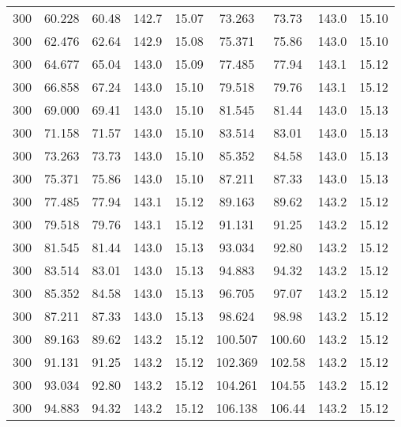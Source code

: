 \documentclass[captions=tableheading]{scrartcl}
\begin{document}
\begin{table}
\begin{tabular}{S[table-format=3.0] S[table-format=2.3] S[table-format=2.2] S[table-format=3.1] S[table-format=2.2] S[table-format=3.3] S[table-format=3.2] S[table-format=3.1] S[table-format=2.2]}
    300 &  60.228 &  60.48 & 142.7 & 15.07 &   73.263 &  73.73 & 143.0 & 15.10 \\
    300 &  62.476 &  62.64 & 142.9 & 15.08 &   75.371 &  75.86 & 143.0 & 15.10 \\
    300 &  64.677 &  65.04 & 143.0 & 15.09 &   77.485 &  77.94 & 143.1 & 15.12 \\
    300 &  66.858 &  67.24 & 143.0 & 15.10 &   79.518 &  79.76 & 143.1 & 15.12 \\
    300 &  69.000 &  69.41 & 143.0 & 15.10 &   81.545 &  81.44 & 143.0 & 15.13 \\
    300 &  71.158 &  71.57 & 143.0 & 15.10 &   83.514 &  83.01 & 143.0 & 15.13 \\
    300 &  73.263 &  73.73 & 143.0 & 15.10 &   85.352 &  84.58 & 143.0 & 15.13 \\
    300 &  75.371 &  75.86 & 143.0 & 15.10 &   87.211 &  87.33 & 143.0 & 15.13 \\
    300 &  77.485 &  77.94 & 143.1 & 15.12 &   89.163 &  89.62 & 143.2 & 15.12 \\
    300 &  79.518 &  79.76 & 143.1 & 15.12 &   91.131 &  91.25 & 143.2 & 15.12 \\
    300 &  81.545 &  81.44 & 143.0 & 15.13 &   93.034 &  92.80 & 143.2 & 15.12 \\
    300 &  83.514 &  83.01 & 143.0 & 15.13 &   94.883 &  94.32 & 143.2 & 15.12 \\
    300 &  85.352 &  84.58 & 143.0 & 15.13 &   96.705 &  97.07 & 143.2 & 15.12 \\
    300 &  87.211 &  87.33 & 143.0 & 15.13 &   98.624 &  98.98 & 143.2 & 15.12 \\
    300 &  89.163 &  89.62 & 143.2 & 15.12 &  100.507 & 100.60 & 143.2 & 15.12 \\
    300 &  91.131 &  91.25 & 143.2 & 15.12 &  102.369 & 102.58 & 143.2 & 15.12 \\
    300 &  93.034 &  92.80 & 143.2 & 15.12 &  104.261 & 104.55 & 143.2 & 15.12 \\
    300 &  94.883 &  94.32 & 143.2 & 15.12 &  106.138 & 106.44 & 143.2 & 15.12 \\



\bottomrule
\end{tabular}

  \end{table}
\end{document}
